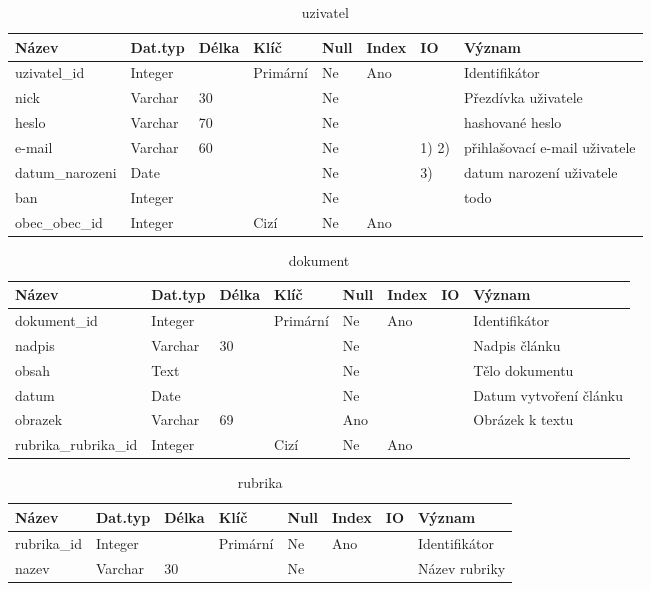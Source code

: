 \documentclass[12pt]{article}
\begin{document}
\begin{enumerate}
\begin{enumerate}[label*=\arabic*.]
		\begin{table}[htp]
			\caption{uzivatel}
			\begin{tabularx}{1.25\textwidth}{|P{3.5cm}|p{1.6cm}|p{1.2cm}|p{1.6cm}|p{1cm}|p{1.2cm}|p{1cm}|X|}
				\hline
				\textbf{Název}& \textbf{Dat.typ} & \textbf{Délka} & \textbf{Klíč} & \textbf{Null}&\textbf{Index}& \textbf{IO}& \textbf{Význam} \\
				\hline
				uzivatel\_id&Integer&&Primární&Ne&Ano&&Identifikátor\\
				\hline
				nick&Varchar&30&&Ne&&&Přezdívka uživatele\\
				\hline
				heslo&Varchar&70&&Ne&&&hashované heslo\\
				\hline
				e-mail&Varchar&60&&Ne&&1\big) 2\big)& přihlašovací e-mail uživatele\\
				\hline
				datum\_narozeni&Date&&&Ne&&3\big)&datum narození uživatele\\
				\hline
				ban&Integer&&&Ne&&&todo\\
				\hline
				obec\_obec\_id&Integer&&Cizí&Ne&Ano&&\\
				\hline
			\end{tabularx}
		\end{table}

		\begin{table}[htp]
			\caption{dokument}
			\begin{tabularx}{1.25\textwidth}{|P{3.5cm}|p{1.6cm}|p{1.2cm}|p{1.6cm}|p{1cm}|p{1.2cm}|p{1cm}|X|}
				\hline
				\textbf{Název}& \textbf{Dat.typ} & \textbf{Délka} & \textbf{Klíč} & \textbf{Null}&\textbf{Index}& \textbf{IO}& \textbf{Význam} \\
				\hline
				dokument\_id&Integer&&Primární&Ne&Ano&&Identifikátor\\
				\hline
				nadpis&Varchar&30&&Ne&&&Nadpis článku\\
				\hline
				obsah&Text&&&Ne&&&Tělo dokumentu\\
				\hline
				datum&Date&&&Ne&&&Datum vytvoření článku\\
				\hline
				obrazek&Varchar&69&&Ano&&&Obrázek k textu\\
				\hline
				rubrika\_rubrika\_id&Integer&&Cizí&Ne&Ano&&\\
				\hline
			\end{tabularx}
		\end{table}

		\begin{table}[htp]
			\caption{rubrika}
			\begin{tabularx}{1.25\textwidth}{|P{3.5cm}|p{1.6cm}|p{1.2cm}|p{1.6cm}|p{1cm}|p{1.2cm}|p{1cm}|X|}
				\hline
				\textbf{Název}& \textbf{Dat.typ} & \textbf{Délka} & \textbf{Klíč} & \textbf{Null}&\textbf{Index}& \textbf{IO}& \textbf{Význam} \\
				\hline
				rubrika\_id&Integer&&Primární&Ne&Ano&&Identifikátor\\
				\hline
				nazev&Varchar&30&&Ne&&&Název rubriky\\
				\hline						
			\end{tabularx}
		\end{table}


\end{enumerate}
\end{enumerate}
\end{document}
